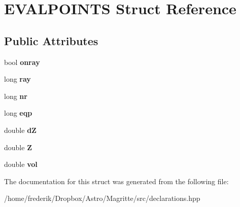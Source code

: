 \hypertarget{structEVALPOINTS}{}\section{E\+V\+A\+L\+P\+O\+I\+N\+TS Struct Reference}
\label{structEVALPOINTS}
\subsection*{Public Attributes}
\begin{DoxyCompactItemize}
\item 
\mbox{\label{structEVALPOINTS_abaf9be99524c41438cccaf34f58e7d72}} 
bool {\bfseries onray}
\item 
\mbox{\label{structEVALPOINTS_a19fb9d451f9cfe1aa7450294220ece45}} 
long {\bfseries ray}
\item 
\mbox{\label{structEVALPOINTS_a5ac3ced758609e74a70bfab050535e52}} 
long {\bfseries nr}
\item 
\mbox{\label{structEVALPOINTS_a4055ee81193d007040272cb619bf5e82}} 
long {\bfseries eqp}
\item 
\mbox{\label{structEVALPOINTS_af99161a377c1e2367830a172b2ef4121}} 
double {\bfseries dZ}
\item 
\mbox{\label{structEVALPOINTS_a4695fd707c791f59f4f77a5b087c791f}} 
double {\bfseries Z}
\item 
\mbox{\label{structEVALPOINTS_a63c8116987c3007d37d969052f6acfbe}} 
double {\bfseries vol}
\end{DoxyCompactItemize}


The documentation for this struct was generated from the following file\+:\begin{DoxyCompactItemize}
\item 
/home/frederik/\+Dropbox/\+Astro/\+Magritte/src/declarations.\+hpp\end{DoxyCompactItemize}
